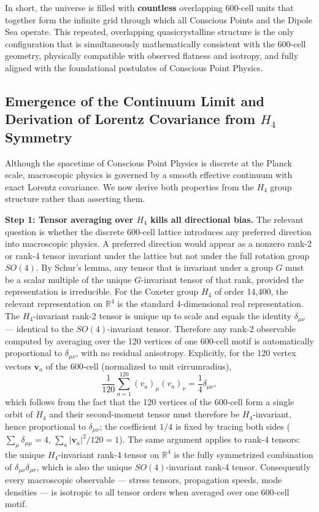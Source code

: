 \documentclass[11pt,letterpaper]{article}
\begin{document}
In short, the universe is filled with \textbf{countless} overlapping 600-cell units that together form the infinite grid through which all Conscious Points and the Dipole Sea operate. This repeated, overlapping quasicrystalline structure is the only configuration that is simultaneously mathematically consistent with the 600-cell geometry, physically compatible with observed flatness and isotropy, and fully aligned with the foundational postulates of Conscious Point Physics.

\subsection{Emergence of the Continuum Limit and Derivation of Lorentz Covariance 
from $H_4$ Symmetry}

Although the spacetime of Conscious Point Physics is discrete at the Planck scale, macroscopic physics is governed by a smooth effective continuum with 
exact Lorentz covariance. We now derive both properties from the $H_4$ group structure rather than asserting them.

\textbf{Step 1: Tensor averaging over $H_4$ kills all directional bias.}
The relevant question is whether the discrete 600-cell lattice introduces any preferred direction into macroscopic physics. A preferred direction would appear as a nonzero rank-2 or rank-4 tensor invariant under the lattice but not under the full rotation group $SO(4)$. By Schur's lemma, any tensor that is invariant under a group $G$ must be a scalar multiple of the unique $G$-invariant tensor of that rank, provided the representation is irreducible. For the Coxeter group $H_4$ of order 14,400, the relevant representation on $\mathbb{R}^4$ is the standard 4-dimensional real representation. The $H_4$-invariant rank-2 tensor is unique up to scale and equals the identity $\delta_{\mu\nu}$ — identical to the $SO(4)$-invariant tensor. Therefore any rank-2 observable computed by averaging over the 120 vertices of one 600-cell motif is automatically proportional to $\delta_{\mu\nu}$, with no residual anisotropy. Explicitly, for the 120 vertex vectors $\mathbf{v}_a$ of the 600-cell (normalized to unit circumradius),
\begin{equation}
\frac{1}{120}\sum_{a=1}^{120} (v_a)_\mu (v_a)_\nu = \frac{1}{4}\delta_{\mu\nu},
\label{eq:H4_rank2}
\end{equation}
which follows from the fact that the 120 vertices of the 600-cell form a single orbit of $H_4$ and their second-moment tensor must therefore be 
$H_4$-invariant, hence proportional to $\delta_{\mu\nu}$; the coefficient $1/4$ is fixed by tracing both sides ($\sum_\mu \delta_{\mu\mu} = 4$, 
$\sum_a |\mathbf{v}_a|^2/120 = 1$). The same argument applies to rank-4 tensors: the unique $H_4$-invariant rank-4 tensor on $\mathbb{R}^4$ is the 
fully symmetrized combination of $\delta_{\mu\nu}\delta_{\rho\sigma}$, which is also the unique $SO(4)$-invariant rank-4 tensor. Consequently every 
macroscopic observable — stress tensors, propagation speeds, mode densities — is isotropic to all tensor orders when averaged over one 600-cell motif.
\end{document}
